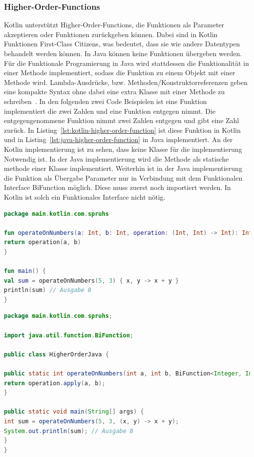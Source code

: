 \documentclass[11pt]{article}
\begin{document}
    \subsubsection{Higher-Order-Functions}
    Kotlin unterstützt Higher-Order-Functions, die Funktionen als Parameter akzeptieren oder Funktionen zurückgeben können.
    Dabei sind in Kotlin Funktionen First-Class Citizens, was bedeutet, dass sie wie andere Datentypen behandelt werden können.
    In Java können keine Funktionen übergeben werden.
    Für die Funktionale Programierung in Java wird stattdessen die Funktionalität in einer Methode implementiert, sodass die Funktion zu einem Objekt mit einer Methode wird.
    Lambda-Ausdrücke, bzw. Methoden/Konstruktorreferenzen geben eine kompakte Syntax ohne dabei eine extra Klasse mit einer Methode zu schreiben~\cite[820]{insel}.
    In den folgenden zwei Code Beispielen ist eine Funktion implementiert die zwei Zahlen und eine Funktion entgegen nimmt.
    Die entgegengenommene Funktion nimmt zwei Zahlen entgegen und gibt eine Zahl zurück.
    In Listing~\ref{lst:kotlin-higher-order-function} ist diese Funktion in Kotlin und in Listing~\ref{lst:java-higher-order-function} in Java implementiert.
    An der Kotlin implementierung ist zu sehen, dass keine Klasse für die implementierung Notwendig ist.
    In der Java implementierung wird die Methode als statische methode einer Klasse implementiert.
    Weiterhin ist in der Java implementierung die Funktion als Übergabe Parameter nur in Verbindung mit dem Funktionalen Interface BiFunction möglich.
    Diese muss zuerst noch importiert werden.
    In Kotlin ist solch ein Funktionales Interface nicht nötig.

    \begin{lstlisting}[language=Kotlin, caption={HigherOrderKotlin.kt}, label={lst:kotlin-higher-order-function}]
package main.kotlin.com.spruhs

fun operateOnNumbers(a: Int, b: Int, operation: (Int, Int) -> Int): Int {
return operation(a, b)
}

fun main() {
val sum = operateOnNumbers(5, 3) { x, y -> x + y }
println(sum) // Ausgabe 8
}
    \end{lstlisting}

    \begin{lstlisting}[language=Java, caption={HigherOrderJava.java}, label={lst:java-higher-order-function}]
package main.kotlin.com.spruhs;

import java.util.function.BiFunction;

public class HigherOrderJava {

public static int operateOnNumbers(int a, int b, BiFunction<Integer, Integer, Integer> operation) {
return operation.apply(a, b);
}

public static void main(String[] args) {
int sum = operateOnNumbers(5, 3, (x, y) -> x + y);
System.out.println(sum); // Ausgabe 8
}
}
    \end{lstlisting}
\end{document}
